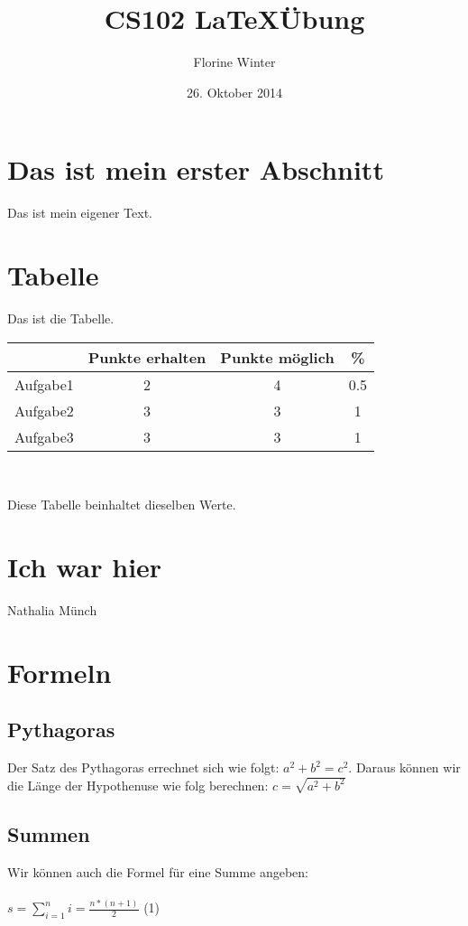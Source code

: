 \documentclass{article}
\author{Florine Winter}
\title{CS102 \LaTeX \"Ubung}
\date{26. Oktober 2014}
\begin{document}
\maketitle
\section{Das ist mein erster Abschnitt}
Das ist mein eigener Text.
\section{Tabelle}
Das ist die Tabelle.\\

\begin{tabular}{c|c|c|c}

 & Punkte erhalten & Punkte m\"oglich & \% \\
\hline
Aufgabe1 & 2 & 4 & 0.5 \\
Aufgabe2 & 3 & 3 & 1 \\
Aufgabe3 & 3 & 3 & 1 \\

\end{tabular}\\
\begin{center}
Diese Tabelle beinhaltet dieselben Werte.
\end{center}
\section{Ich war hier}
Nathalia Münch
\section{Formeln}
\subsection{Pythagoras}
Der Satz des Pythagoras errechnet sich wie folgt:
$a^2 + b^2 = c^2$. Daraus k\"onnen wir die L\"ange der Hypothenuse wie folg berechnen: $c= \sqrt{a^2 + b^2}$
\subsection{Summen}
Wir k\"onnen auch die Formel f\"ur eine Summe angeben:\\
\\
\centering
$s= \sum\limits_{i=1}^{n}i=\frac{n*(n+1)}{2}$ (1)
\end{document}
